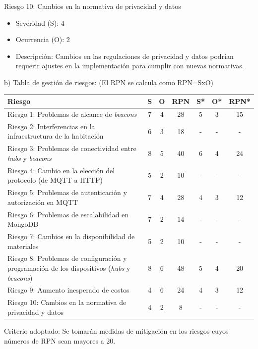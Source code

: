 \documentclass[
11pt, %
]{charter}
\begin{document}
Riesgo 10: Cambios en la normativa de privacidad y datos
\begin{itemize}
	\item Severidad (S): 4
	\item Ocurrencia (O): 2
	\item Descripción: Cambios en las regulaciones de privacidad y datos podrían requerir ajustes en la implementación para cumplir con nuevas normativas.
\end{itemize}

b) Tabla de gestión de riesgos:      (El RPN se calcula como RPN=SxO)

\begin{table}[htpb]
\centering
\begin{tabularx}{\linewidth}{@{}|X|c|c|c|c|c|c|@{}}
\hline
\rowcolor[HTML]{C0C0C0} 
Riesgo & S & O & RPN & S* & O* & RPN* \\ \hline
Riesgo 1: Problemas de alcance de \textit{beacons} & 7 & 4 & 28 & 5 & 3 & 15     \\ \hline
Riesgo 2: Interferencias en la infraestructura de la habitación & 6 & 3 & 18 & - & - & -      \\ \hline
Riesgo 3: Problemas de conectividad entre \textit{hubs} y \textit{beacons} & 8 & 5 & 40 & 6 & 4 & 24      \\ \hline
Riesgo 4: Cambio en la elección del protocolo (de MQTT a HTTP) & 5 & 2 & 10 & - & - & -      \\ \hline
Riesgo 5: Problemas de autenticación y autorización en MQTT & 7 & 4 & 28 & 4 & 3 & 12      \\ \hline
Riesgo 6: Problemas de escalabilidad en MongoDB&  7 &  2 &  14   &   - & - & -       \\ \hline
Riesgo 7: Cambios en la disponibilidad de materiales& 5  & 2  &   10  &  - & - & -       \\ \hline
Riesgo 8: Problemas de configuración y programación de los dispositivos (\textit{hubs} y \textit{beacons})& 8  & 6  &    48 & 5 & 4 & 20      \\ \hline
Riesgo 9: Aumento inesperado de costos       & 4  &  6 &  24   &  4  & 3   &   12   \\ \hline
Riesgo 10: Cambios en la normativa de privacidad y datos       & 4  &  2 &   8  &  - & - & -       \\ \hline
\end{tabularx}%
\end{table}

Criterio adoptado: 
Se tomarán medidas de mitigación en los riesgos cuyos números de RPN sean mayores a 20.
\end{document}
